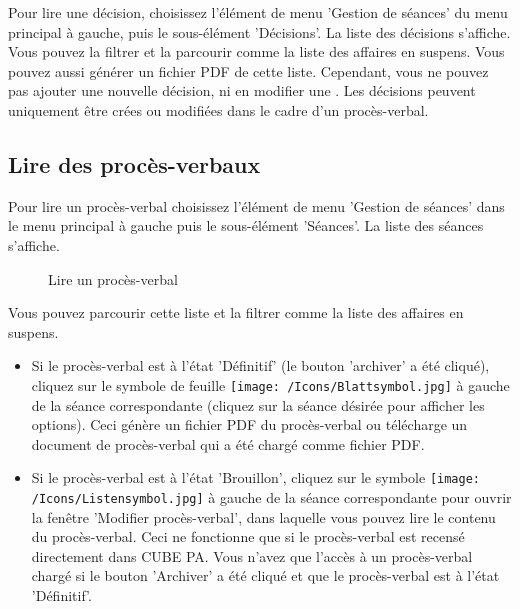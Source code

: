 Pour lire une décision, choisissez l'élément de menu 'Gestion de séances' du menu principal à gauche, puis le sous-élément 'Décisions'. La liste des décisions s'affiche. Vous pouvez la filtrer et la parcourir comme la liste des affaires en suspens. Vous pouvez aussi générer un fichier PDF de cette liste. Cependant, vous ne pouvez pas ajouter une nouvelle décision, ni en modifier une . Les décisions peuvent uniquement être crées ou modifiées dans le cadre d'un procès-verbal.

\subsection{Lire des procès-verbaux}

Pour lire un procès-verbal choisissez l'élément de menu 'Gestion de séances' dans le menu principal à gauche puis le sous-élément 'Séances'. La liste des séances s'affiche.

\begin{figure}[H]
\caption{Lire un procès-verbal}
\end{figure}

Vous pouvez parcourir cette liste et la filtrer comme la liste des affaires en suspens.

\begin{itemize}
\item
Si le procès-verbal est à l'état 'Définitif' (le bouton 'archiver' a été cliqué), cliquez sur le symbole de feuille \texttt{[image: /Icons/Blattsymbol.jpg]}  à gauche de la séance correspondante (cliquez sur la séance désirée pour afficher les options). Ceci génère un fichier PDF du procès-verbal ou télécharge un document de procès-verbal qui a été chargé comme fichier PDF.
\item
Si le procès-verbal est à l'état 'Brouillon', cliquez sur le symbole \texttt{[image: /Icons/Listensymbol.jpg]}  à gauche de la séance correspondante pour ouvrir la fenêtre 'Modifier procès-verbal', dans laquelle vous pouvez lire le contenu du procès-verbal. Ceci ne fonctionne que si le procès-verbal est recensé directement dans CUBE PA. Vous n'avez que l'accès à un procès-verbal chargé si le bouton 'Archiver' a été cliqué et que le procès-verbal est à l'état 'Définitif'.
\end{itemize}
